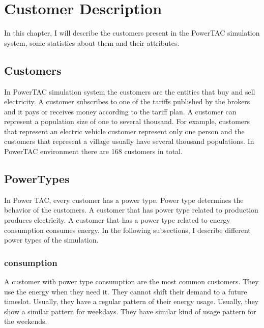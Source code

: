 
\chapter{Customer Description} 

In this chapter, I will describe the customers present in the PowerTAC simulation system, some statistics about them and their attributes.

\section{Customers}

In PowerTAC simulation system the customers are the entities that buy and sell electricity. A customer subscribes to one of the tariffs published by the brokers and it pays or receives money according to the tariff plan. A customer can represent a population size of one to several thousand. For example, customers that represent an electric vehicle customer represent only one person and the customers that represent a village usually have several thousand populations. In PowerTAC environment there are 168 customers in total.

\section {PowerTypes}
In Power TAC, every customer has a power type. Power type determines the behavior of the customers. A customer that has power type related to production produces electricity. A customer that has a power type related to energy consumption consumes energy. In the following subsections, I describe different power types of the simulation.

\subsection{consumption}

A customer with power type consumption are the most common customers. They use the energy when they need it. They cannot shift their demand to a future timeslot. Usually, they have a regular pattern of their energy usage. Usually, they show a similar pattern for weekdays. They have similar kind of usage pattern for the weekends. 

